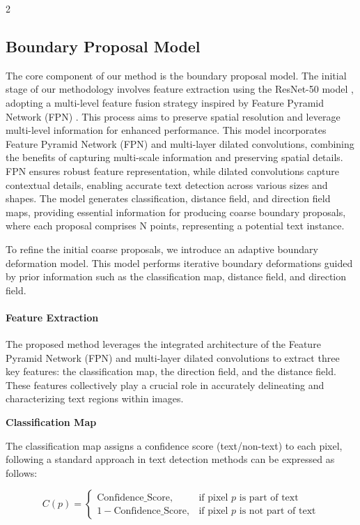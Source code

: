\documentclass[sn-mathphys,Numbered]{sn-jnl}%
\begin{document}
\begin{multicols}{2}
\subsection{Boundary Proposal Model}
The core component of our method is the boundary proposal model. The initial stage of our methodology involves feature extraction using the ResNet-50 model \cite{resnet}, adopting a multi-level feature fusion strategy inspired by Feature Pyramid Network (FPN) \cite{fpn}. This process aims to preserve spatial resolution and leverage multi-level information for enhanced performance. This model incorporates Feature Pyramid Network (FPN) and multi-layer dilated convolutions, combining the benefits of capturing multi-scale information and preserving spatial details. FPN ensures robust feature representation, while dilated convolutions capture contextual details, enabling accurate text detection across various sizes and shapes. The model generates classification, distance field, and direction field maps, providing essential information for producing coarse boundary proposals, where each proposal comprises N points, representing a potential text instance.

To refine the initial coarse proposals, we introduce an adaptive boundary deformation model. This model performs iterative boundary deformations guided by prior information such as the classification map, distance field, and direction field.

\paragraph{Feature Extraction}

The proposed method leverages the integrated architecture of the Feature Pyramid Network (FPN) and multi-layer dilated convolutions to extract three key features: the classification map, the direction field, and the distance field. These features collectively play a crucial role in accurately delineating and characterizing text regions within images.

\textbf{Classification Map}

The classification map assigns a confidence score (text/non-text) to each pixel, following a standard approach in text detection methods \cite{long2020textsnake}\cite{zhang2020deep}\cite{zhou2017east} can be expressed as follows:

\begin{equation}
C(p) = 
\begin{cases}
\text{Confidence\_Score}, & \text{if pixel } p \text{ is part of text} \\
1 - \text{Confidence\_Score}, & \text{if pixel } p \text{ is not part of text}
\end{cases}
\end{equation}


\end{multicols}
\end{document}

